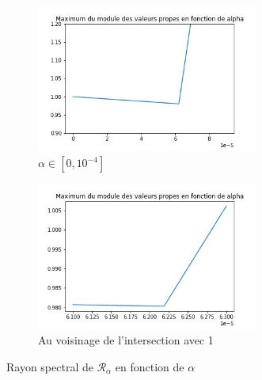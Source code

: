 \documentclass[12pt]{report}
\begin{document}
\begin{figure}
    \centering
    \begin{subfigure}[b]{0.4\textwidth}
        \centering
        \includegraphics[width=0.8\textwidth, height=0.8\textwidth]{choix_alpha_1D.jpg}
        \caption{$\alpha \in [0, 10^{-4}]$}
    \end{subfigure}
    \hfill
    \begin{subfigure}[b]{0.4\textwidth}
        \centering
        \includegraphics[width=0.8\textwidth, height=0.8\textwidth]{choix_alpha_1D_zoom.jpg}
        \caption{Au voisinage de l'intersection avec 1}
    \end{subfigure}
    \caption{Rayon spectral de $\mathcal{R}_\alpha$ en fonction de $\alpha$}
    \label{fig:choix_alpha_1D}
\end{figure}
\end{document}
